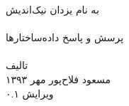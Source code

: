 \begin{titlepage}
\begin{center}
{\nastaliq
به نام یزدان نیک‌اندیش\\
\vspace{10ex}
\hrulefill\\[0.3cm]
{\Huge
پرسش و پاسخ داده‌ساختارها
}\\[0.3cm]
\hrulefill\\
\vfill
تالیف
\\[0.4cm]
مسعود فلاح‌پور
\vfill
مهر ۱۳۹۳
\\[0.3cm]
ویرایش
}
۰.۱
\end{center}
\end{titlepage}